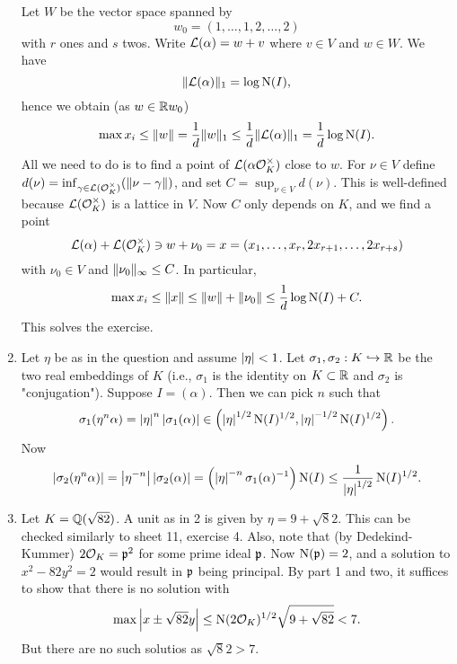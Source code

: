 \documentclass[a4paper,11pt]{article}
\begin{document}
\begin{enumerate}[wide, labelindent=0pt]
        Let $W$ be the vector space spanned by 
        \begin{equation*}
            w_0 =  (1,\dots,1,2, \dots, 2)
        \end{equation*}
        with $r$ ones and $s$ twos.
        Write $\mathcal{L}(\alpha) = w + v$ where
        $v \in V$ and $w \in W$. We have 
        \begin{equation*}
            \lVert\mathcal{L}(\alpha)\rVert_1 = \log \operatorname{N}(I),
        \end{equation*}
        hence we obtain (as $w \in \mathbb{R} w_0$)
        $$\max x_i \leq \lVert w\rVert = \frac 1{d} \lVert w\rVert_1 \leq \frac 1d
        \lVert\mathcal{L}(\alpha)\rVert_1 = \frac 1d \log \operatorname{N}(I).$$
        All we need to do is to find a point of $\mathcal{L}(\alpha \mathcal{O}_K^\times)$
        close to $w$. For $\nu \in V$ define $d(\nu) = \inf_{\gamma \in \mathcal{L}(\mathcal{O}_K^\times)}
        (\lVert\nu-\gamma\rVert)$, and set $C = \sup_{\nu \in V} d(\nu)$. This 
        is well-defined because $\mathcal{L}(\mathcal{O}_K^\times)$ is a lattice in $V$.
        Now $C$ only depends on $K$, and we find a point 
        $$\mathcal{L}(\alpha) + \mathcal{L}(\mathcal{O}_K^\times) \ni w + \nu_0 = x = (x_1,\dots, x_r,
        2x_{r+1},\dots, 2x_{r+s})$$
        with $\nu_0 \in V$ and $\lVert\nu_0\rVert_\infty \leq C$. In particular,
        \begin{equation*}
        \max x_i \leq \lVert x\rVert \leq \lVert w\rVert + \lVert\nu_0\rVert \leq
        \frac 1d \log \operatorname{N}(I) + C.
        \end{equation*}
        This solves the exercise.
        
    \item Let $\eta$ be as in the question and assume $\left\lvert \eta \right\rvert < 1$. Let
        $\sigma_1, \sigma_2: K \hookrightarrow \mathbb{R}$ be the two real embeddings of $K$ (i.e., 
        $\sigma_1$ is the identity on $K \subset \mathbb{R}$ and $\sigma_2$ is "conjugation").
        Suppose $I = (\alpha)$. Then we can pick $n$ such that 
        \begin{equation*}
            \sigma_1(\eta^n \alpha) = \left\lvert \eta \right\rvert^n \left\lvert \sigma_1(\alpha) \right\rvert
            \in \left(\left\lvert \eta \right\rvert^{1/2} \operatorname{N}(I)^{1/2}, \left\lvert \eta \right\rvert^{-1/2}
            \operatorname{N}(I)^{1/2}\right).
        \end{equation*}
        Now 
        \begin{equation*}
            \left\lvert \sigma_2(\eta^n \alpha) \right\rvert = \left\lvert \eta^{-n} \right\rvert \left\lvert \sigma_2(\alpha) \right\rvert
            = \left( \left\lvert \eta \right\rvert^{-n} \sigma_1(\alpha)^{-1} \right) \operatorname{N}(I)
                \leq \frac 1{\left\lvert \eta \right\rvert^{1/2}} \operatorname{N}(I)^{1/2}.
        \end{equation*}

    \item Let $K = \mathbb{Q}(\sqrt {82})$. A unit as in 2 is given by $\eta = 9 + \sqrt 82$. 
        This can be checked similarly to sheet 11, exercise 4. 
        Also, note that (by Dedekind-Kummer) $2 \mathcal{O}_K= \mathfrak{p}^2$ for some prime
        ideal $\mathfrak{p}$. Now $\operatorname{N}(\mathfrak{p})=2$, and a solution to $x^2 - 82y^2 = 2$
        would result in $\mathfrak{p}$ being principal. 
        By part 1 and two, it suffices to show that there is no solution with
        $$\max \left\lvert x \pm \sqrt {82} y \right\rvert \leq \operatorname{N}(2 \mathcal{O}_K)^{1/2} \sqrt{9 + \sqrt{82}}
        < 7.$$
        But there are no such solutios as $\sqrt 82 > 7$. 
\end{enumerate}
\end{document}
